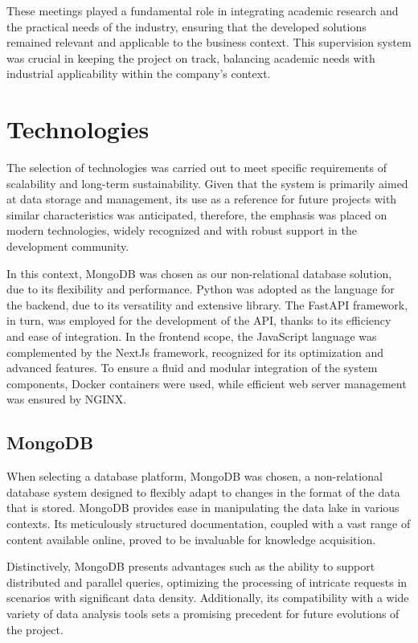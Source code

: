 These meetings played a fundamental role in integrating academic research and the practical needs of the industry, ensuring that the developed solutions remained relevant and applicable to the business context. This supervision system was crucial in keeping the project on track, balancing academic needs with industrial applicability within the company's context.

\section[Tecnologias]{Technologies}
The selection of technologies was carried out to meet specific requirements of scalability and long-term sustainability. Given that the system is primarily aimed at data storage and management, its use as a reference for future projects with similar characteristics was anticipated, therefore, the emphasis was placed on modern technologies, widely recognized and with robust support in the development community.

In this context, MongoDB was chosen as our non-relational database solution, due to its flexibility and performance. Python was adopted as the language for the backend, due to its versatility and extensive library. The FastAPI framework, in turn, was employed for the development of the \gls{API}, thanks to its efficiency and ease of integration. In the frontend scope, the JavaScript language was complemented by the NextJs framework, recognized for its optimization and advanced features. To ensure a fluid and modular integration of the system components, Docker containers were used, while efficient web server management was ensured by NGINX.

\subsection{MongoDB}

When selecting a database platform, MongoDB \cite{mongodbDocs} was chosen, a non-relational database system designed to flexibly adapt to changes in the format of the data that is stored. MongoDB provides ease in manipulating the data lake in various contexts. Its meticulously structured documentation, coupled with a vast range of content available online, proved to be invaluable for knowledge acquisition.

Distinctively, MongoDB presents advantages such as the ability to support distributed and parallel queries, optimizing the processing of intricate requests in scenarios with significant data density. Additionally, its compatibility with a wide variety of data analysis tools sets a promising precedent for future evolutions of the project.

